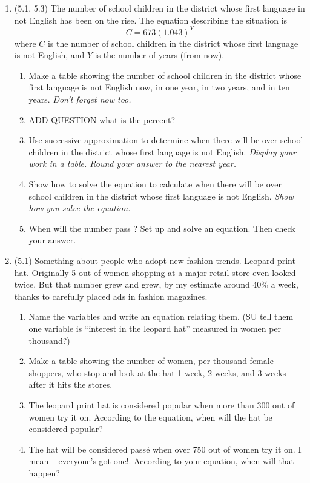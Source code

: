 \documentclass[12pt]{article}
\begin{document}
\begin{enumerate}
\item (5.1, 5.3) The number of school children in the district whose first language in not English has been on the rise.  The equation describing the situation is $$C=673(1.043)^Y$$ where $C$ is the number of school children in the district whose first language is not English, and $Y$ is the number of years (from now).
\begin{enumerate}
\item Make a table showing the number of school children in the district whose first language is not English now, in one year, in two years, and in ten years. \emph{Don't forget now too.}
\item ADD QUESTION what is the percent?
\item Use successive approximation to determine when there will be over  school children in the district whose first language is not English.  \emph{Display your work in a table.  Round your answer to the nearest year.}
\item Show how to solve the equation to calculate when there will be over  school children in the district whose first language is not English. \emph{Show how you solve the equation.}  
\item When will the number pass ?  Set up and solve an equation. Then check your answer.
\end{enumerate}


\item (5.1) Something about people who adopt new fashion trends. Leopard print hat. Originally 5 out of  women shopping at a major retail store even looked twice.  But that number grew and grew, by my estimate around 40\% a week, thanks to carefully placed ads in fashion magazines.
\begin{enumerate}
\item Name the variables and write an equation relating them.  (SU tell them one variable is ``interest in the leopard hat'' measured in women per thousand?)
\item Make a table showing the number of women, per thousand female shoppers, who stop and look at the hat 1 week, 2 weeks, and 3 weeks after it hits the stores.
\item The leopard print hat is considered popular when more than 300 out of  women try it on.  According to the equation, when will the hat be considered popular?
\item The hat will be considered pass\'e when over 750 out of  women try it on.  I mean -- everyone's got one!.  According to your equation, when will that happen?
\end{enumerate}


\end{enumerate}
\end{document}
